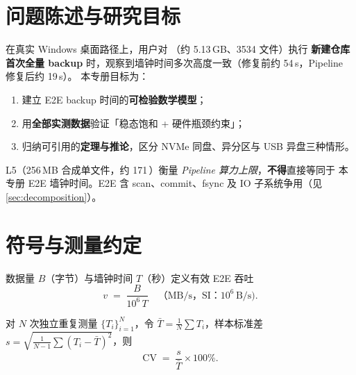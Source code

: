 \section{问题陈述与研究目标}\label{sec:problem}

在真实 Windows 桌面路径上，用户对 （约 5.13\,GB、3534 文件）执行
\textbf{新建仓库首次全量 backup} 时，观察到墙钟时间多次高度一致（修复前约 54\,s，Pipeline 修复后约 19\,s）。
本专册目标为：
\begin{enumerate}[nosep]
  \item 建立 E2E backup 时间的\textbf{可检验数学模型}；
  \item 用\textbf{全部实测数据}验证「稳态饱和 + 硬件瓶颈约束」；
  \item 归纳可引用的\textbf{定理与推论}，区分 NVMe 同盘、异分区与 USB 异盘三种情形。
\end{enumerate}

\begin{warnbox}
L5（256\,MB 合成单文件，约 171\,\SIthroughput{}）衡量 \emph{Pipeline 算力上限}，\textbf{不得}直接等同于
本专册 E2E 墙钟时间。E2E 含 scan、commit、fsync 及 IO 子系统争用（见 \cref{sec:decomposition}）。
\end{warnbox}

\section{符号与测量约定}\label{sec:notation}

\begin{definition}[SI 吞吐]
\label{def:si-throughput}
数据量 $B$（字节）与墙钟时间 $T$（秒）定义有效 E2E 吞吐
\begin{equation}
  v \;=\; \frac{B}{10^{6}\,T}\quad\text{（MB/s，SI：}10^{6}\,\text{B/s}\text{)}.
  \label{eq:throughput}
\end{equation}
\end{definition}

\begin{definition}[变异系数]
\label{def:cv}
对 $N$ 次独立重复测量 $\{T_i\}_{i=1}^{N}$，令 $\bar{T}=\frac{1}{N}\sum T_i$，样本标准差
$s=\sqrt{\frac{1}{N-1}\sum(T_i-\bar{T})^2}$，则
\begin{equation}
  \mathrm{CV} \;=\; \frac{s}{\bar{T}}\times 100\%.
  \label{eq:cv}
\end{equation}
\end{definition}

